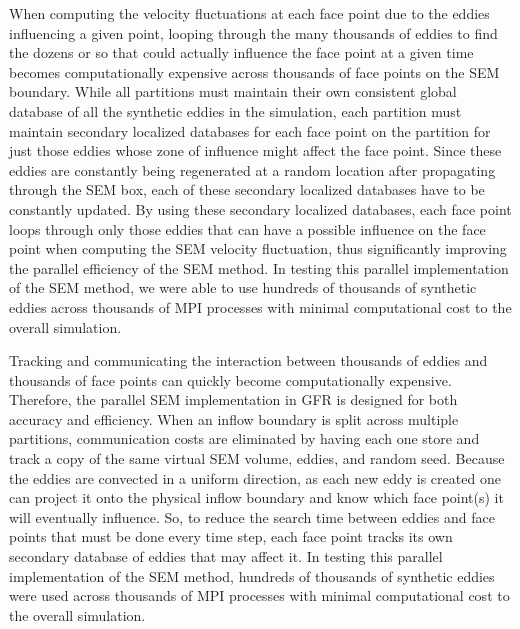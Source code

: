 When computing the velocity fluctuations at each face point due to the eddies
influencing a given point, looping through the many thousands of eddies to find the
dozens or so that could actually influence the face point at a given time
becomes computationally expensive across thousands of face points on the SEM
boundary.
%
While all partitions must maintain their own consistent global database of all
the synthetic eddies in the simulation, each partition must maintain secondary
localized databases for each face point on the partition for just those eddies
whose zone of influence might affect the face point.
%
Since these eddies are constantly being regenerated at a random location after
propagating through the SEM box, each of these secondary localized databases
have to be constantly updated.
%
By using these secondary localized databases, each face point loops through only
those eddies that can have a possible influence on the face point when computing
the SEM velocity fluctuation, thus significantly improving the parallel
efficiency of the SEM method.
%
In testing this parallel implementation of the SEM method, we were able to use
hundreds of thousands of synthetic eddies across thousands of MPI processes with
minimal computational cost to the overall simulation.


Tracking and communicating the interaction between thousands of eddies
and thousands of face points can quickly become computationally expensive.
%
Therefore, the parallel SEM implementation in GFR is designed for both
accuracy and efficiency.
%
When an inflow boundary is split across multiple partitions,
communication costs are eliminated by having each one store and track a
copy of the same virtual SEM volume, eddies, and random seed.
%
Because the eddies are convected in a uniform direction,
as each new eddy is created one can project it onto the
physical inflow boundary and know which face point(s) it will
eventually influence.
%
So, to reduce the search time between eddies and face points that
must be done every time step, each face point tracks its own
secondary database of eddies that may affect it.
%
%
In testing this parallel implementation of the SEM method,
hundreds of thousands of synthetic eddies were used
across thousands of MPI processes with minimal computational cost
to the overall simulation.

